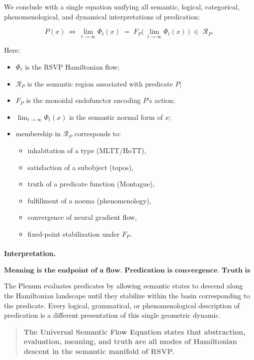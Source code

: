 \documentclass[12pt,letterpaper]{article}
\begin{document}
We conclude with a single equation unifying all semantic, logical, categorical,
phenomenological, and dynamical interpretations of predication:

\[
\boxed{
P(x)\ \Longleftrightarrow\ 
\lim_{t \to \infty} \Phi_t(x)
\;=\;
F_P\bigl(\,\lim_{t \to \infty} \Phi_t(x)\,\bigr)
\;\in\;
\mathcal{R}_P.
}
\]

Here:

\begin{itemize}
    \item $\Phi_t$ is the RSVP Hamiltonian flow;
    \item $\mathcal{R}_P$ is the semantic region associated with predicate $P$;
    \item $F_P$ is the monoidal endofunctor encoding $P$'s action;
    \item $\lim_{t\to\infty} \Phi_t(x)$ is the semantic normal form of $x$;
    \item membership in $\mathcal{R}_P$ corresponds to:
        \begin{itemize}
            \item inhabitation of a type (MLTT/HoTT),
            \item satisfaction of a subobject (topos),
            \item truth of a predicate function (Montague),
            \item fulfillment of a noema (phenomenology),
            \item convergence of neural gradient flow,
            \item fixed-point stabilization under $F_P$.
        \end{itemize}
\end{itemize}

\paragraph{Interpretation.}
\[
\textbf{Meaning is the endpoint of a flow.  
Predication is convergence.  
Truth is a fixed point.}
\]

The Plenum evaluates predicates by allowing semantic states to descend along the
Hamiltonian landscape until they stabilize within the basin corresponding to the
predicate.  Every logical, grammatical, or phenomenological description of
predication is a different presentation of this single geometric dynamic.

\begin{quote}
\textbf{The Universal Semantic Flow Equation states that abstraction,
evaluation, meaning, and truth are all modes of Hamiltonian descent in the
semantic manifold of RSVP.}
\end{quote}
\end{document}
